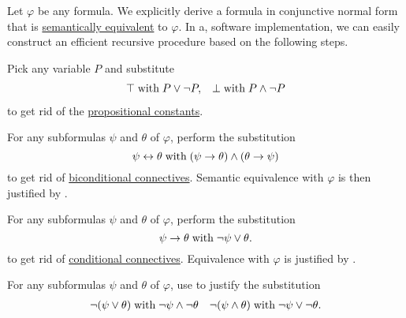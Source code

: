 \begin{algorithm}\label{alg:conjunctive_normal_form_reduction}
  Let \( \varphi \) be any formula. We explicitly derive a formula in conjunctive normal form that is \hyperref[def:propositional_semantics/equivalence]{semantically equivalent} to \( \varphi \). In a, software implementation, we can easily construct an efficient recursive procedure based on the following steps.

  \begin{thmenum}
     Pick any variable \( P \) and substitute
    \begin{align*}
      \top \T{with} P \vee \neg P, && \bot \T{with} P \wedge \neg P
    \end{align*}
    to get rid of the \hyperref[def:propositional_language/constants]{propositional constants}.

     For any subformulas \( \psi \) and \( \theta \) of \( \varphi \), perform the substitution
    \begin{equation*}
      \psi \leftrightarrow \theta \T{with} (\psi \rightarrow \theta) \wedge (\theta \rightarrow \psi)
    \end{equation*}
    to get rid of \hyperref[def:propositional_language/connectives/biconditional]{biconditional connectives}. Semantic equivalence with \( \varphi \) is then justified by .

     For any subformulas \( \psi \) and \( \theta \) of \( \varphi \), perform the substitution
    \begin{equation*}
      \psi \rightarrow \theta \T{with} \neg \psi \vee \theta.
    \end{equation*}
    to get rid of \hyperref[def:propositional_language/connectives/conditional]{conditional connectives}. Equivalence with \( \varphi \) is justified by .

     For any subformulas \( \psi \) and \( \theta \) of \( \varphi \), use  to justify the substitution
    \begin{align*}
      \neg(\psi \vee \theta) \T{with} \neg \psi \wedge \neg \theta
      &&
      \neg(\psi \wedge \theta) \T{with} \neg \psi \vee \neg \theta.
    \end{align*}


\end{thmenum}
\end{algorithm}
